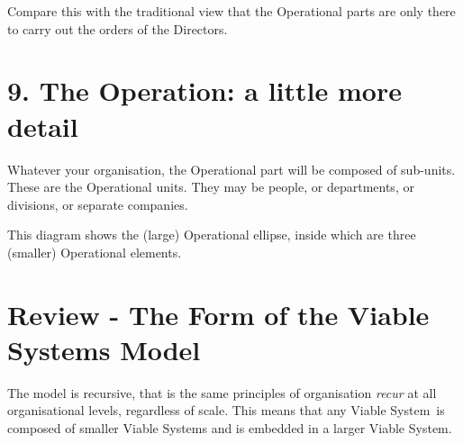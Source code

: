 Compare this with the traditional view that the Operational parts are only there to carry out the orders of the Directors.

\section*{9. The \textcolor{O}{\textbf{Operation}}: a little more detail}
Whatever your organisation, the Operational part will be composed of sub-units. These are the Operational units. They may be people, or departments, or divisions, or separate companies.

This diagram shows the (large) Operational ellipse, inside which are three (smaller) Operational elements.


\section*{Review - The Form of the Viable Systems Model}
The model is recursive, that is the same principles of organisation \textit{recur} at all organisational levels, regardless of scale. This means that any Viable System is composed of smaller Viable Systems and is embedded in a larger Viable System.
